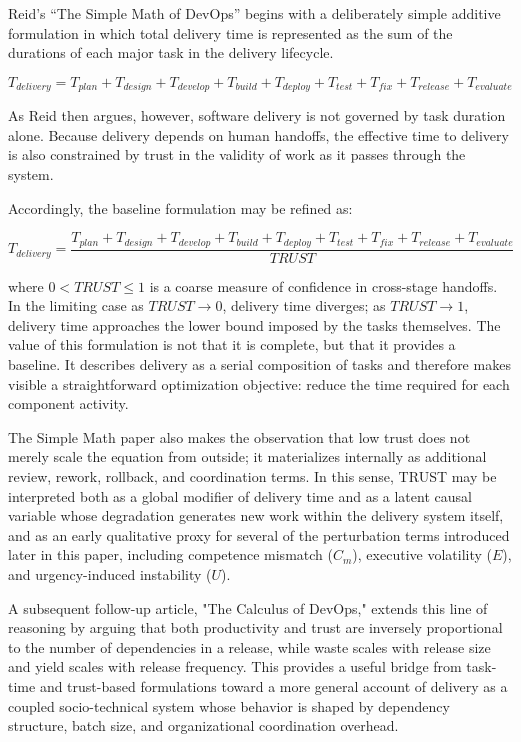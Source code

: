 \documentclass[letterpaper]{article}
\begin{document}
Reid's ``The Simple Math of DevOps'' begins with a deliberately simple additive formulation in which total delivery time is represented as the sum of the durations of each major task in the delivery lifecycle.\cite{reid2015simplemath}

\begin{equation}
T_{delivery} = T_{plan} + T_{design} + T_{develop} + T_{build} + T_{deploy} + T_{test} + T_{fix} + T_{release} + T_{evaluate}
\end{equation}

As Reid then argues, however, software delivery is not governed by task duration alone. Because delivery depends on human handoffs, the effective time to delivery is also constrained by trust in the validity of work as it passes through the system.\cite{reid2015simplemath}

Accordingly, the baseline formulation may be refined as:

\begin{equation}
T_{delivery} =
\frac{
T_{plan} + T_{design} + T_{develop} + T_{build} + T_{deploy} + T_{test} + T_{fix} + T_{release} + T_{evaluate}
}{
TRUST
}
\end{equation}

where $0 < TRUST \leq 1$ is a coarse measure of confidence in cross-stage handoffs. In the limiting case as $TRUST \to 0$, delivery time diverges; as $TRUST \to 1$, delivery time approaches the lower bound imposed by the tasks themselves.\cite{reid2015simplemath}
The value of this formulation is not that it is complete, but that it provides a baseline. It describes delivery as a serial composition of tasks and therefore makes visible a straightforward optimization objective: reduce the time required for each component activity. 

The Simple Math paper also makes the observation that low trust does not merely scale the equation from outside; it materializes internally as additional review, rework, rollback, and coordination terms.\cite{reid2015simplemath} In this sense, TRUST may be interpreted both as a global modifier of delivery time and as a latent causal variable whose degradation generates new work within the delivery system itself, and as an early qualitative proxy for several of the perturbation terms introduced later in this paper, including competence mismatch ($C_m$), executive volatility ($E$), and urgency-induced instability ($U$).

A subsequent follow-up article, "The Calculus of DevOps," extends this line of reasoning by arguing that both productivity and trust are inversely proportional to the number of dependencies in a release, while waste scales with release size and yield scales with release frequency.\cite{deardo2015calculus} This provides a useful bridge from task-time and trust-based formulations toward a more general account of delivery as a coupled socio-technical system whose behavior is shaped by dependency structure, batch size, and organizational coordination overhead.
\end{document}
